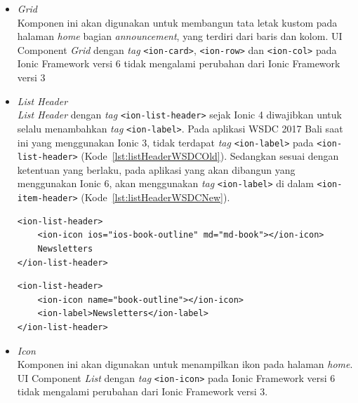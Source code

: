 \begin{enumerate}
\begin{itemize}
			\item \textit{Grid} \\
			Komponen ini akan digunakan untuk membangun tata letak kustom pada halaman \textit{home} bagian \textit{announcement}, yang terdiri dari baris dan kolom. UI Component \textit{Grid} dengan \textit{tag} \texttt{<ion-card>}, \texttt{<ion-row>} dan \texttt{<ion-col>} pada Ionic Framework versi 6 tidak mengalami perubahan dari Ionic Framework versi 3
			
			\item \textit{List Header} \\
			\textit{List Header} dengan \textit{tag} \texttt{<ion-list-header>} sejak Ionic 4 diwajibkan untuk selalu menambahkan \textit{tag} \texttt{<ion-label>}. Pada aplikasi WSDC 2017 Bali saat ini yang menggunakan Ionic 3, tidak terdapat \textit{tag} \texttt{<ion-label>} pada \texttt{<ion-list-header>} (Kode~\ref{lst:listHeaderWSDCOld}). Sedangkan sesuai dengan ketentuan yang berlaku, pada aplikasi yang akan dibangun yang menggunakan Ionic 6, akan menggunakan \textit{tag} \texttt{<ion-label>} di dalam \texttt{<ion-item-header>} (Kode~\ref{lst:listHeaderWSDCNew}).
			
\begin{lstlisting}[label={lst:listHeaderWSDCOld}, caption=\textit{Tag} <ion-list-header> dengan Ionic 3 di Aplikasi WSDC 2017 Bali Saat Ini]
<ion-list-header>
	<ion-icon ios="ios-book-outline" md="md-book"></ion-icon>
    Newsletters
</ion-list-header>
\end{lstlisting}

\begin{lstlisting}[label={lst:listHeaderWSDCNew}, caption=\textit{Tag} <ion-list-header> dengan Ionic 6 di Aplikasi WSDC 2017 Bali yang Akan dibuat]
<ion-list-header>
	<ion-icon name="book-outline"></ion-icon>
    <ion-label>Newsletters</ion-label>
</ion-list-header>
\end{lstlisting}
			
			\item \textit{Icon} \\
			Komponen ini akan digunakan untuk menampilkan ikon pada halaman \textit{home}. UI Component \textit{List} dengan \textit{tag} \texttt{<ion-icon>} pada Ionic Framework versi 6 tidak mengalami perubahan dari Ionic Framework versi 3.
			

\end{itemize}
\end{enumerate}
